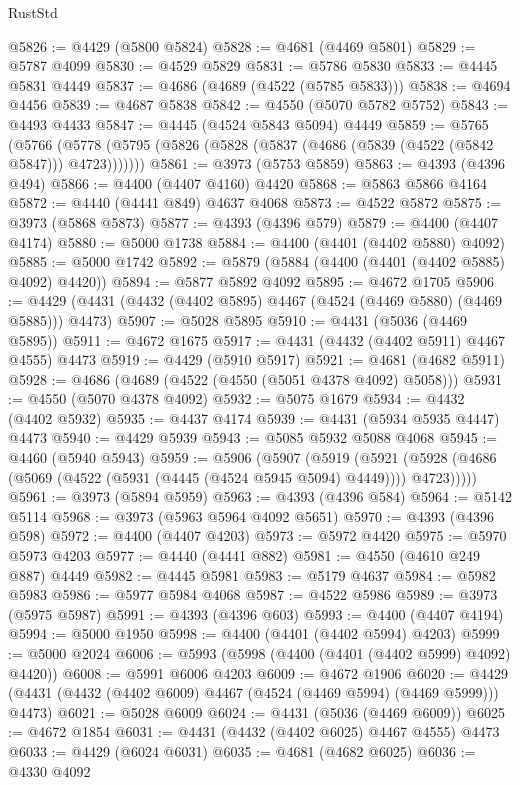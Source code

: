\begin{lexlean}{RustStd}
\begin{coremodule}
@5826 := @4429 (@5800 @5824)
@5828 := @4681 (@4469 @5801)
@5829 := @5787 @4099
@5830 := @4529 @5829
@5831 := @5786 @5830
@5833 := @4445 @5831 @4449
@5837 := @4686 (@4689 (@4522 (@5785 @5833)))
@5838 := @4694 @4456
@5839 := @4687 @5838
@5842 := @4550 (@5070 @5782 @5752)
@5843 := @4493 @4433
@5847 := @4445 (@4524 @5843 @5094) @4449
@5859 := @5765
    (@5766 (@5778 (@5795 (@5826 (@5828 (@5837 (@4686 (@5839 (@4522 (@5842 @5847))) @4723)))))))
@5861 := @3973 (@5753 @5859)
@5863 := @4393 (@4396 @494)
@5866 := @4400 (@4407 @4160) @4420
@5868 := @5863 @5866 @4164
@5872 := @4440 (@4441 @849) @4637 @4068
@5873 := @4522 @5872
@5875 := @3973 (@5868 @5873)
@5877 := @4393 (@4396 @579)
@5879 := @4400 (@4407 @4174)
@5880 := @5000 @1738
@5884 := @4400 (@4401 (@4402 @5880) @4092)
@5885 := @5000 @1742
@5892 := @5879 (@5884 (@4400 (@4401 (@4402 @5885) @4092) @4420))
@5894 := @5877 @5892 @4092
@5895 := @4672 @1705
@5906 := @4429 (@4431 (@4432 (@4402 @5895) @4467 (@4524 (@4469 @5880) (@4469 @5885))) @4473)
@5907 := @5028 @5895
@5910 := @4431 (@5036 (@4469 @5895))
@5911 := @4672 @1675
@5917 := @4431 (@4432 (@4402 @5911) @4467 @4555) @4473
@5919 := @4429 (@5910 @5917)
@5921 := @4681 (@4682 @5911)
@5928 := @4686 (@4689 (@4522 (@4550 (@5051 @4378 @4092) @5058)))
@5931 := @4550 (@5070 @4378 @4092)
@5932 := @5075 @1679
@5934 := @4432 (@4402 @5932)
@5935 := @4437 @4174
@5939 := @4431 (@5934 @5935 @4447) @4473
@5940 := @4429 @5939
@5943 := @5085 @5932 @5088 @4068
@5945 := @4460 (@5940 @5943)
@5959 := @5906
    (@5907
      (@5919
        (@5921 (@5928 (@4686 (@5069 (@4522 (@5931 (@4445 (@4524 @5945 @5094) @4449)))) @4723)))))
@5961 := @3973 (@5894 @5959)
@5963 := @4393 (@4396 @584)
@5964 := @5142 @5114
@5968 := @3973 (@5963 @5964 @4092 @5651)
@5970 := @4393 (@4396 @598)
@5972 := @4400 (@4407 @4203)
@5973 := @5972 @4420
@5975 := @5970 @5973 @4203
@5977 := @4440 (@4441 @882)
@5981 := @4550 (@4610 @249 @887) @4449
@5982 := @4445 @5981
@5983 := @5179 @4637
@5984 := @5982 @5983
@5986 := @5977 @5984 @4068
@5987 := @4522 @5986
@5989 := @3973 (@5975 @5987)
@5991 := @4393 (@4396 @603)
@5993 := @4400 (@4407 @4194)
@5994 := @5000 @1950
@5998 := @4400 (@4401 (@4402 @5994) @4203)
@5999 := @5000 @2024
@6006 := @5993 (@5998 (@4400 (@4401 (@4402 @5999) @4092) @4420))
@6008 := @5991 @6006 @4203
@6009 := @4672 @1906
@6020 := @4429 (@4431 (@4432 (@4402 @6009) @4467 (@4524 (@4469 @5994) (@4469 @5999))) @4473)
@6021 := @5028 @6009
@6024 := @4431 (@5036 (@4469 @6009))
@6025 := @4672 @1854
@6031 := @4431 (@4432 (@4402 @6025) @4467 @4555) @4473
@6033 := @4429 (@6024 @6031)
@6035 := @4681 (@4682 @6025)
@6036 := @4330 @4092

\end{coremodule}
\end{lexlean}
